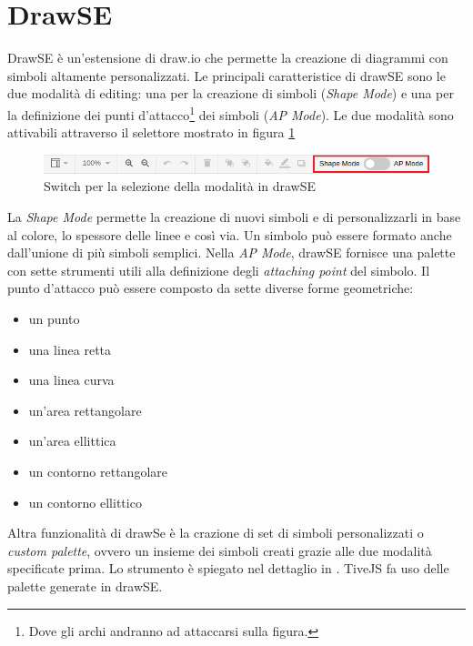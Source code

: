     \section{DrawSE}
        DrawSE è un'estensione di draw.io che permette la creazione di diagrammi con simboli altamente personalizzati. Le principali caratteristice di drawSE sono le due modalità di editing: una per la creazione di simboli (\textit{Shape Mode}) e una per la definizione dei punti d'attacco\footnote{Dove gli archi andranno ad attaccarsi sulla figura.} dei simboli (\textit{AP Mode}).
        Le due modalità sono attivabili attraverso il selettore mostrato in figura \ref{fig:mode_switch}
        \begin{figure}[htbp]
            \centering
            \includegraphics[scale=0.7]{Figure/mode_switch.png}
            \caption{Switch per la selezione della modalità in drawSE}
            \label{fig:mode_switch}
        \end{figure}
        \newline
        La \textit{Shape Mode} permette la creazione di nuovi simboli e di personalizzarli in base al colore, lo spessore delle linee e così via. Un simbolo può essere formato anche dall'unione di più simboli semplici.
        Nella \textit{AP Mode}, drawSE fornisce una palette con sette strumenti utili alla definizione degli \textit{attaching point} del simbolo. Il punto d'attacco può essere composto da sette diverse forme geometriche:
        \begin{itemize}
            \item un punto
            \item una linea retta
            \item una linea curva
            \item un'area rettangolare
            \item un'area ellittica
            \item un contorno rettangolare
            \item un contorno ellittico
        \end{itemize}
        Altra funzionalità di drawSe è la crazione di set di simboli personalizzati o \textit{custom palette}, ovvero un insieme dei simboli creati grazie alle due modalità specificate prima. Lo strumento è spiegato nel dettaglio in \cite{drawSE}. TiveJS fa uso delle palette generate in drawSE.